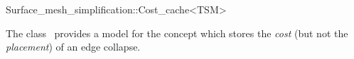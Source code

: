 

\begin{ccRefClass}{Surface_mesh_simplification::Cost_cache<TSM>}


\ccDefinition

The class \ccRefName\ provides a model for the  concept
which stores the {\em cost} (but not the {\em placement}) of an edge collapse.


\ccIsModel
{}

\ccSeeAlso
{}\\
\\
\\
\\
\\

\end{ccRefClass}


